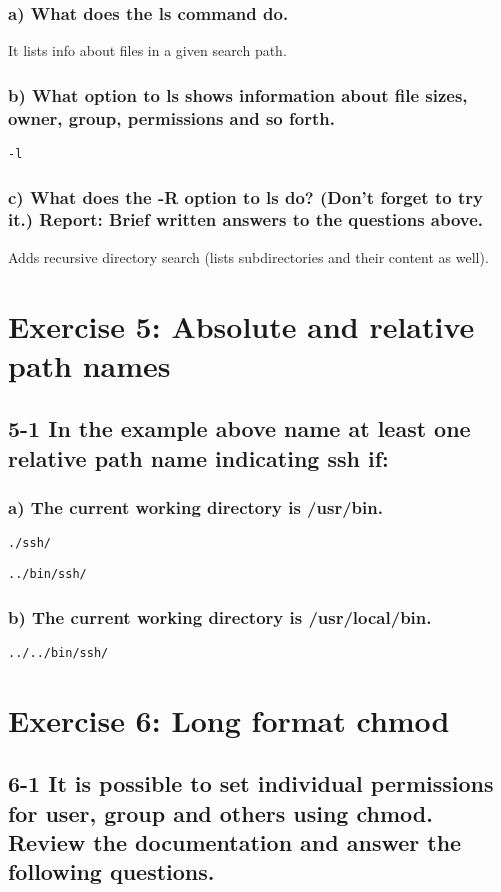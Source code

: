 \subsubsection{a) What does the ls command do.}
It lists info about files in a given search path.

\subsubsection{b) What option to ls shows information about file sizes, owner, group, permissions and so forth.}
\verb=-l=

\subsubsection{c) What does the -R option to ls do? (Don't forget to try it.) Report: Brief written answers to the questions above.}
Adds recursive directory search (lists subdirectories and their content as well).

\section{Exercise 5: Absolute and relative path names}
\subsection{5-1 In the example above name at least one relative path name indicating ssh if:}
\subsubsection{a) The current working directory is /usr/bin.}
\verb=./ssh/=

\verb=../bin/ssh/ =

\subsubsection{b) The current working directory is /usr/local/bin.}
\verb=../../bin/ssh/=

\section{Exercise 6: Long format chmod}
\subsection{6-1 It is possible to set individual permissions for user, group and others using chmod. Review the documentation and answer the following questions.}

